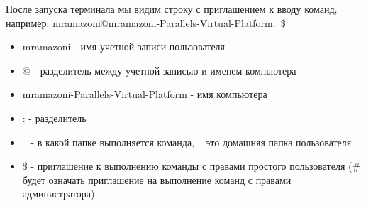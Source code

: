 	После запуска терминала мы видим строку с приглашением к вводу команд, например: 
mramazoni@mramazoni-Parallels-Virtual-Platform:~\$ 
\begin{itemize}

	\item mramazoni - имя учетной записи пользователя
	\item @ - разделитель между учетной записью и именем компьютера 
	\item mramazoni-Parallels-Virtual-Platform - имя компьютера 
	\item : - разделитель 
	\item ~ - в какой папке выполняется команда, ~ это домашняя папка пользователя
	\item \$ - приглашение к выполнению команды с правами простого пользователя (# будет 		означать приглашение на выполнение команд с правами администратора)

\end{itemize}
